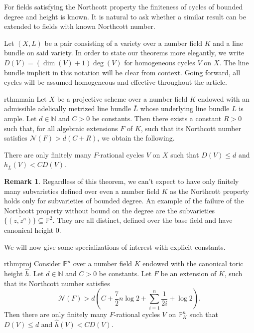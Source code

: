 \documentclass[11pt, a4paper, UKenglish]{amsart}
\newcommand{\N}{\mathcal N}
\newcommand{\bbN}{\mathbb{N}}
\newcommand{\bbP}{\mathbb{P}}
\newcommand{\eqn}[1]{\begin{equation*}#1\end{equation*}}
\theoremstyle{definition}
\newtheorem{rk_}[thm_]{Remark}
\newcommand{\rk}[1]{\begin{rk_}#1\end{rk_}}
\begin{document}
For fields satisfying the Northcott property the finiteness of cycles of bounded degree and height is known. It is natural to ask whether a similar result can be extended to fields with known Northcott number.

Let $(X,L)$ be a pair consisting of a variety over a number field $K$ and a line bundle on said variety. In order to state our theorems more elegantly, we write $D(V) = (\dim(V) + 1)\deg(V)$ for homogeneous cycles $V$ on $X$. The line bundle implicit in this notation will be clear from context. Going forward, all cycles will be assumed homogeneous and effective throughout the article.

\begin{restatable}{rthm}{main}
\label{main}Let $X$ be a projective scheme over a number field $K$ endowed with an admissible adelically metrized line bundle $\bar{L}$ whose underlying line bundle $L$ is ample. Let $d \in \bbN$ and $C > 0$ be constants. Then there exists a constant $R > 0$ such that, for all algebraic extensions $F$ of $K$, such that its Northcott number satisfies $\N(F) > d(C + R)$, we obtain the following.

There are only finitely many $F$-rational cycles $V$ on $X$ such that $D(V) \leq d$ and $h_{\bar{L}}(V) < CD(V)$.
\end{restatable}

\rk{Regardless of this theorem, we can't expect to have only finitely many subvarieties defined over even a number field $K$ as the Northcott property holds only for subvarieties of bounded degree. An example of the failure of the Northcott property without bound on the degree are the subvarieties $\overline{\{(z,z^n)\}} \subseteq \bbP^2$. They are all distinct, defined over the base field and have canonical height $0$.}

We will now give some specializations of interest with explicit constants.

\begin{restatable}{rthm}{proj}
\label{proj}Consider $\bbP^n$ over a number field $K$ endowed with the canonical toric height $\hat{h}$. Let $d \in \bbN$ and $C > 0$ be constants. Let $F$ be an extension of $K$, such that its Northcott number satisfies 
\eqn{\N(F) > d\left(C + \frac{7}{2} n\log 2  + \sum_{i = 1}^n \frac{1}{2i} +\log 2\right).}
Then there are only finitely many $F$-rational cycles $V$ on $\bbP^n_{K}$ such that $D(V) \leq d$ and $\hat{h}(V) < CD(V)$.
\end{restatable}
\end{document}
